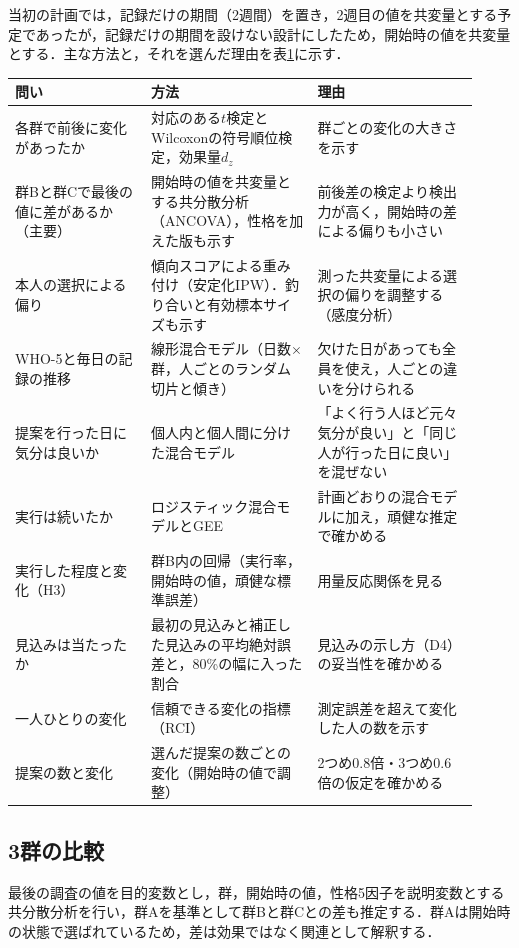 当初の計画では，記録だけの期間（2週間）を置き，2週目の値を共変量とする予定であったが，記録だけの期間を設けない設計にしたため，開始時の値を共変量とする．主な方法と，それを選んだ理由を表\ref{tab:analysisplan}に示す．

\begin{table}[t]
\centering
{}
\label{tab:analysisplan}
\small
\begin{tabular}{@{}p{0.27\linewidth}p{0.33\linewidth}p{0.32\linewidth}@{}}
\toprule
問い & 方法 & 理由 \\
\midrule
各群で前後に変化があったか & 対応のある$t$検定とWilcoxonの符号順位検定，効果量$d_z$ & 群ごとの変化の大きさを示す \\
群Bと群Cで最後の値に差があるか（主要） & 開始時の値を共変量とする共分散分析（ANCOVA），性格を加えた版も示す & 前後差の検定より検出力が高く，開始時の差による偏りも小さい\cite{vickers2001} \\
本人の選択による偏り & 傾向スコアによる重み付け（安定化IPW）\cite{rosenbaum1983,hoshino2009}．釣り合いと有効標本サイズも示す & 測った共変量による選択の偏りを調整する（感度分析） \\
WHO-5と毎日の記録の推移 & 線形混合モデル（日数$\times$群，人ごとのランダム切片と傾き）\cite{laird1982} & 欠けた日があっても全員を使え，人ごとの違いを分けられる \\
提案を行った日に気分は良いか & 個人内と個人間に分けた混合モデル\cite{curran2011} & 「よく行う人ほど元々気分が良い」と「同じ人が行った日に良い」を混ぜない \\
実行は続いたか & ロジスティック混合モデルとGEE\cite{liang1986} & 計画どおりの混合モデルに加え，頑健な推定で確かめる \\
実行した程度と変化（H3） & 群B内の回帰（実行率，開始時の値，頑健な標準誤差） & 用量反応関係を見る \\
見込みは当たったか & 最初の見込みと補正した見込みの平均絶対誤差と，80\%の幅に入った割合 & 見込みの示し方（D4）の妥当性を確かめる \\
一人ひとりの変化 & 信頼できる変化の指標（RCI）\cite{jacobson1991} & 測定誤差を超えて変化した人の数を示す \\
提案の数と変化 & 選んだ提案の数ごとの変化（開始時の値で調整） & 2つめ0.8倍・3つめ0.6倍の仮定を確かめる \\
\bottomrule
\end{tabular}
\end{table}

\subsection{3群の比較}
最後の調査の値を目的変数とし，群，開始時の値，性格5因子を説明変数とする共分散分析を行い，群Aを基準として群Bと群Cとの差も推定する．群Aは開始時の状態で選ばれているため，差は効果ではなく関連として解釈する．

